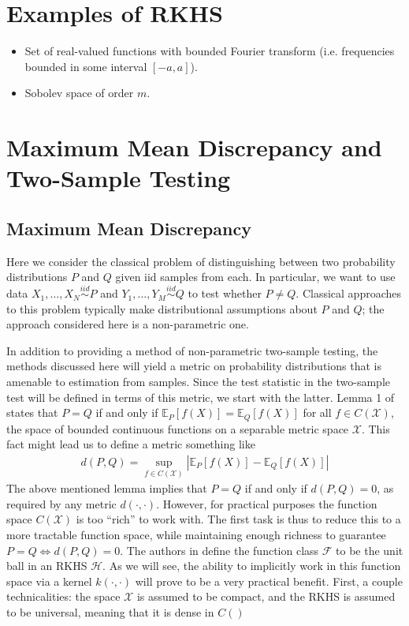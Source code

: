 \documentclass[12pt]{article}
\newcommand*{\abs}[1]{\left\lvert#1\right\rvert}
\newcommand{\E}{\mathbb{E}}
\begin{document}
 \section{Examples of RKHS}
 \begin{itemize}
 \item Set of real-valued functions with bounded Fourier transform (i.e. frequencies bounded in some interval $[-a, a]$). 
 \item Sobolev space of order $m$. 
 \end{itemize}


\section{Maximum Mean Discrepancy and Two-Sample Testing}
\subsection{Maximum Mean Discrepancy}
Here we consider the classical problem of distinguishing between two probability distributions $P$ and $Q$ given iid samples from each. In particular, we want to use data 
$X_1, \dots, X_N \overset{iid}{\sim} P$ and $Y_1, \dots, Y_M \overset{iid}{\sim} Q$ to test whether $P \neq Q$. Classical approaches to this problem typically make distributional 
assumptions about $P$ and $Q$; the approach considered here is a non-parametric one. 

In addition to providing a method of non-parametric two-sample testing, the methods discussed here will yield a metric on probability distributions that is amenable to estimation 
from samples. Since the test statistic in the two-sample test will be defined in terms of this metric, we start with the latter. Lemma 1 of \cite{Gretton1} states that 
$P = Q$ if and only if $\E_P[f(X)] = \E_Q[f(X)]$ for all $f \in C(\mathcal{X})$, the space of bounded continuous functions on a separable metric space 
$\mathcal{X}$. This fact might lead us to define a metric something like 
\begin{align*}
d(P, Q) = \sup_{f \in C(\mathcal{X})} \abs{\E_P[f(X)] - \E_Q[f(X)]}
\end{align*}
The above mentioned lemma implies that $P = Q$ if and only if $d(P, Q) = 0$, as required by any metric $d(\cdot, \cdot)$. However, for practical purposes the function space 
$C(\mathcal{X})$ is too ``rich'' to work with. The first task is thus to reduce this to a more tractable function space, while maintaining enough richness to guarantee 
$P = Q \iff d(P, Q) = 0$. The authors in \cite{Gretton1} define the function class $\mathcal{F}$ to be the unit ball in an RKHS $\mathcal{H}$. As we will see, the ability to implicitly work in this 
function space via a kernel $k(\cdot, \cdot)$ will prove to be a very practical benefit. First, a couple technicalities: the space $\mathcal{X}$ is assumed to be compact, and 
the RKHS  is assumed to be universal, meaning that it is dense in $C()$
\end{document}
